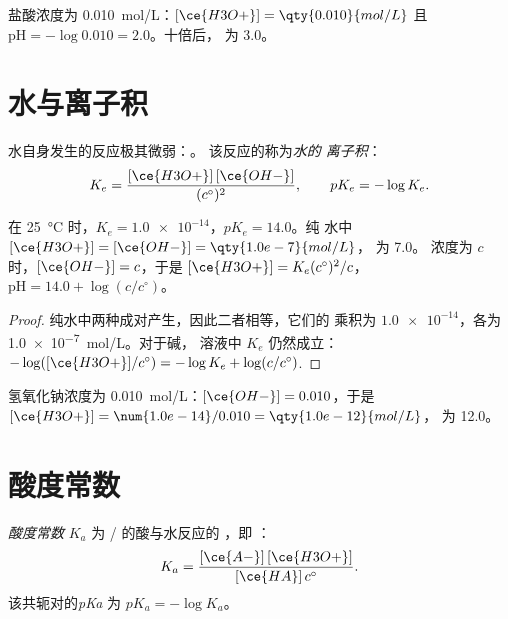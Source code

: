 \begin{example}[盐酸]\label{ex:g12:ka-and-pka:hcl}
盐酸浓度为 \qty{0.010}{mol/L}：$[\ce{H3O+}] = \qty{0.010}{mol/L}$
且 $\mathrm{pH} = -\log 0.010 = 2.0$。十倍后， 为 3.0。
\end{example}

\section{水与离子积}


\begin{definition}[水的离子积]\label{def:g12:ka-and-pka:ionic-product}
水自身发生的反应极其微弱：。
该反应的称为\emph{水的
离子积}：
\[
  K_e = \frac{[\ce{H3O+}]\,[\ce{OH-}]}{(c^\circ)^2},
  \qquad pK_e = -\log K_e .
\]
\end{definition}

\begin{proposition}[中性水与强碱]\label{prop:g12:ka-and-pka:ke}
在 \qty{25}{\celsius} 时，$K_e = \num{1.0e-14}$，$pK_e = 14.0$。纯
水中 $[\ce{H3O+}] = [\ce{OH-}] = \qty{1.0e-7}{mol/L}$， 为 7.0。
浓度为 $c$ 时，$[\ce{OH-}] = c$，于是
$[\ce{H3O+}] = K_e (c^\circ)^2 / c$，$\mathrm{pH} = 14.0 + \log(c/c^\circ)$。
\end{proposition}

\begin{proof}
纯水中两种成对产生，因此二者相等，它们的
乘积为 $\num{1.0e-14}$，各为 \qty{1.0e-7}{mol/L}。对于碱，
溶液中 $K_e$ 仍然成立：
$-\log([\ce{H3O+}]/c^\circ) = -\log K_e + \log(c/c^\circ)$.
\end{proof}

\begin{example}[氢氧化钠]\label{ex:g12:ka-and-pka:naoh}
氢氧化钠浓度为 \qty{0.010}{mol/L}：$[\ce{OH-}] = 0.010$，于是
$[\ce{H3O+}] = \num{1.0e-14}/0.010 = \qty{1.0e-12}{mol/L}$， 为 12.0。
\end{example}

\section{酸度常数}

\begin{definition}[酸度常数，$pK_a$]\label{def:g12:ka-and-pka:ka}
\emph{酸度常数} $K_a$ 为
/ 的酸与水反应的
，即 ：
\[
  K_a = \frac{[\ce{A-}]\,[\ce{H3O+}]}{[\ce{HA}]\,c^\circ} .
\]
该共轭对的\emph{pKa} 为
$pK_a = -\log K_a$。
\end{definition}


